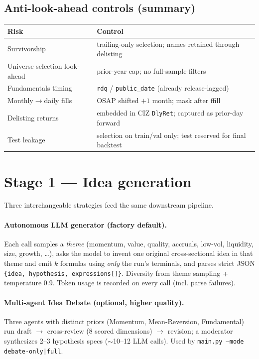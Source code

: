 \documentclass[11pt]{article}
\newcommand{\code}[1]{\texttt{#1}}
\begin{document}
\subsection{Anti-look-ahead controls (summary)}
\begin{center}\small
\begin{tabular}{@{}ll@{}}
\toprule
\textbf{Risk} & \textbf{Control} \\
\midrule
Survivorship & trailing-only selection; names retained through delisting \\
Universe selection look-ahead & prior-year cap; no full-sample filters \\
Fundamentals timing & \code{rdq} / \code{public\_date} (already release-lagged) \\
Monthly$\to$daily fills & OSAP shifted $+1$ month; mask after ffill \\
Delisting returns & embedded in CIZ \code{DlyRet}; captured as prior-day forward \\
Test leakage & selection on train/val only; test reserved for final backtest \\
\bottomrule
\end{tabular}
\end{center}

\section{Stage 1 --- Idea generation}

Three interchangeable strategies feed the same downstream pipeline.

\paragraph{Autonomous LLM generator (factory default).} Each call samples a
\emph{theme} (momentum, value, quality, accruals, low-vol, liquidity, size, growth,
\ldots), asks the model to invent one original cross-sectional idea in that theme and
emit $k$ formulas using \emph{only} the run's terminals, and parses strict JSON
\code{\{idea, hypothesis, expressions[]\}}. Diversity from theme sampling +
temperature 0.9. Token usage is recorded on every call (incl. parse failures).

\paragraph{Multi-agent Idea Debate (optional, higher quality).} Three agents with
distinct priors (Momentum, Mean-Reversion, Fundamental) run draft $\to$ cross-review
(8 scored dimensions) $\to$ revision; a moderator synthesizes 2--3 hypothesis specs
($\sim$10--12 LLM calls). Used by \code{main.py --mode debate-only|full}.
\end{document}
